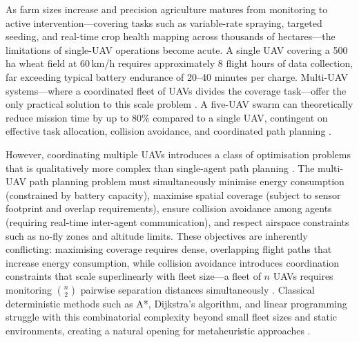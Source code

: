 \documentclass[review,3p,times]{elsarticle}
\begin{document}
As farm sizes increase and precision agriculture matures from monitoring to active intervention---covering tasks such as variable-rate spraying, targeted seeding, and real-time crop health mapping across thousands of hectares---the limitations of single-UAV operations become acute. A single UAV covering a 500\,ha wheat field at 60\,km/h requires approximately 8 flight hours of data collection, far exceeding typical battery endurance of 20--40 minutes per charge. Multi-UAV systems---where a coordinated fleet of UAVs divides the coverage task---offer the only practical solution to this scale problem \cite{chung2018,gupta2016}. A five-UAV swarm can theoretically reduce mission time by up to 80\% compared to a single UAV, contingent on effective task allocation, collision avoidance, and coordinated path planning \cite{chung2018}.

However, coordinating multiple UAVs introduces a class of optimisation problems that is qualitatively more complex than single-agent path planning \cite{chung2018,gupta2016,bekmezci2013,hayat2016}. The multi-UAV path planning problem must simultaneously minimise energy consumption (constrained by battery capacity), maximise spatial coverage (subject to sensor footprint and overlap requirements), ensure collision avoidance among agents (requiring real-time inter-agent communication), and respect airspace constraints such as no-fly zones and altitude limits. These objectives are inherently conflicting: maximising coverage requires dense, overlapping flight paths that increase energy consumption, while collision avoidance introduces coordination constraints that scale superlinearly with fleet size---a fleet of $n$ UAVs requires monitoring $\binom{n}{2}$ pairwise separation distances simultaneously \cite{bekmezci2013}. Classical deterministic methods such as A*, Dijkstra's algorithm, and linear programming struggle with this combinatorial complexity beyond small fleet sizes and static environments, creating a natural opening for metaheuristic approaches \cite{aitsaadi2022}.
\end{document}

